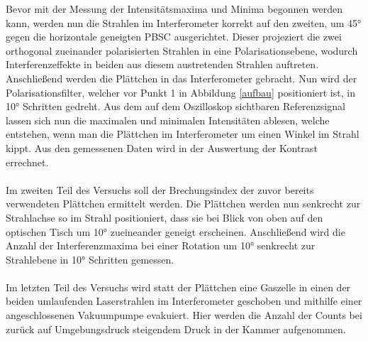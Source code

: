   Bevor mit der Messung der Intensitätsmaxima und Minima begonnen werden kann, werden nun die Strahlen im Interferometer korrekt auf den zweiten, um 45° gegen die horizontale geneigten PBSC ausgerichtet. Dieser projeziert die zwei orthogonal zueinander polarisierten Strahlen in eine Polarisationsebene, wodurch Interferenzeffekte in beiden aus diesem austretenden Strahlen auftreten.\\
  Anschließend werden die Plättchen in das Interferometer gebracht. Nun wird der Polarisationsfilter, welcher vor Punkt 1 in Abbildung \ref{aufbau} positioniert ist,
  in 10° Schritten gedreht.
	Aus dem auf dem Oszilloskop sichtbaren Referenzsignal lassen sich nun die maximalen und minimalen Intensitäten ablesen, welche entstehen, wenn
  man die Plättchen im Interferometer um einen Winkel im Strahl kippt. Aus den gemessenen Daten wird in der Auswertung der Kontrast errechnet.\\
  \\
  Im zweiten Teil des Versuchs soll der Brechungsindex der zuvor bereits verwendeten Plättchen ermittelt werden. Die Plättchen werden nun senkrecht zur Strahlachse so im Strahl positioniert, dass sie bei Blick von oben auf den optischen Tisch um 10° zueineander geneigt erscheinen.
  Anschließend wird die Anzahl der Interferenzmaxima bei einer Rotation um 10° senkrecht zur Strahlebene in 10° Schritten gemessen.\\
  \\
  Im letzten Teil des Versuchs wird statt der Plättchen eine Gaszelle in einen der beiden umlaufenden Laserstrahlen im Interferometer geschoben und mithilfe einer angeschlossenen Vakuumpumpe evakuiert.
  Hier werden die Anzahl der Counts bei zurück auf Umgebungsdruck steigendem Druck in der Kammer aufgenommen.
